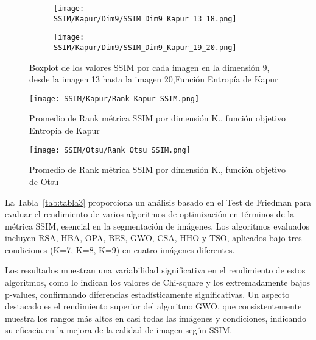 \documentclass[conference]{IEEEtran}
\begin{document}
\begin{figure}
	\centering
	\begin{subfigure}{0.5\textwidth}
		\texttt{[image: SSIM/Kapur/Dim9/SSIM\_Dim9\_Kapur\_13\_18.png]}
	\end{subfigure}   
	\begin{subfigure}{0.5\textwidth}
		\texttt{[image: SSIM/Kapur/Dim9/SSIM\_Dim9\_Kapur\_19\_20.png]}
		\vspace{-150pt} %
	\end{subfigure}
	\caption{Boxplot de los valores SSIM por cada imagen en la dimensión 9, desde la imagen 13 hasta la imagen 20,Función Entropía de Kapur}
	\label{fig:imagenes}    
\end{figure}



\begin{figure}[!htb]
	\centering
	\texttt{[image: SSIM/Kapur/Rank\_Kapur\_SSIM.png]}
	\caption{Promedio de Rank métrica SSIM por dimensión K., función objetivo Entropia de Kapur}
	\label{fig:fig511}
\end{figure}

\begin{figure}[!htb]
	\centering
	\texttt{[image: SSIM/Otsu/Rank\_Otsu\_SSIM.png]}
	\caption{Promedio de Rank métrica SSIM por dimensión K., función objetivo de Otsu}
\end{figure}



\noindent La Tabla~\ref{tab:tabla3} proporciona un análisis basado en el Test de Friedman para evaluar el rendimiento de varios algoritmos de optimización en términos de la métrica SSIM, esencial en la segmentación de imágenes. Los algoritmos evaluados incluyen RSA, HBA, OPA, BES, GWO, CSA, HHO y TSO, aplicados bajo tres condiciones (K=7, K=8, K=9) en cuatro imágenes diferentes. 

\noindent Los resultados muestran una variabilidad significativa en el rendimiento de estos algoritmos, como lo indican los valores de Chi-square y los extremadamente bajos p-values, confirmando diferencias estadísticamente significativas. Un aspecto destacado es el rendimiento superior del algoritmo GWO, que consistentemente muestra los rangos más altos en casi todas las imágenes y condiciones, indicando su eficacia en la mejora de la calidad de imagen según SSIM. 
\end{document}

